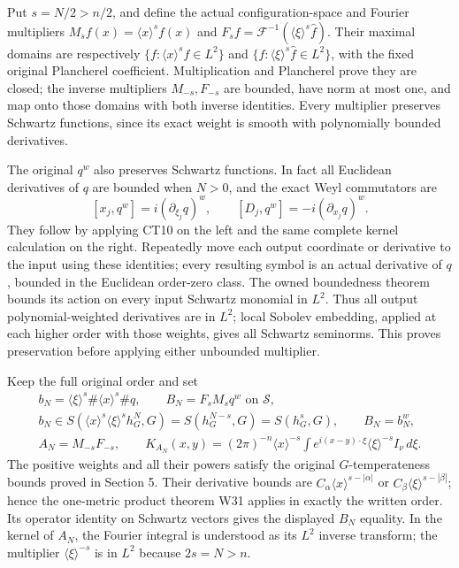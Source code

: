 \documentclass[
  11pt,
]{article}
\begin{document}
Put \(s=N/2>n/2\), and define the actual configuration-space and Fourier
multipliers \(M_s f(x)=\langle x\rangle^sf(x)\) and
\(F_s f=\mathcal F^{-1}(\langle\xi\rangle^s\widehat f)\). Their maximal
domains are respectively \(\{f:\langle x\rangle^sf\in L^2\}\) and
\(\{f:\langle\xi\rangle^s\widehat f\in L^2\}\), with the fixed original
Plancherel coefficient. Multiplication and Plancherel prove they are
closed; the inverse multipliers \(M_{-s},F_{-s}\) are bounded, have norm
at most one, and map onto those domains with both inverse identities.
Every multiplier preserves Schwartz functions, since its exact weight is
smooth with polynomially bounded derivatives.

The original \(q^w\) also preserves Schwartz functions. In fact all
Euclidean derivatives of \(q\) are bounded when \(N>0\), and the exact
Weyl commutators are \[
 [x_j,q^w]=i(\partial_{\xi_j}q)^w,\qquad
 [D_j,q^w]=-i(\partial_{x_j}q)^w.
 \tag{PT16}
\] They follow by applying CT10 on the left and the same complete kernel
calculation on the right. Repeatedly move each output coordinate or
derivative to the input using these identities; every resulting symbol
is an actual derivative of \(q\), bounded in the Euclidean order-zero
class. The owned boundedness theorem bounds its action on every input
Schwartz monomial in \(L^2\). Thus all output polynomial-weighted
derivatives are in \(L^2\); local Sobolev embedding, applied at each
higher order with those weights, gives all Schwartz seminorms. This
proves preservation before applying either unbounded multiplier.

Keep the full original order and set \[
 \begin{gathered}
 b_N=\langle\xi\rangle^s\#\langle x\rangle^s\#q,
 \qquad B_N=F_sM_sq^w\text{ on }\mathcal S,\\
 b_N\in S(\langle x\rangle^s\langle\xi\rangle^s h_G^N,G)
        =S(h_G^{N-s},G)=S(h_G^s,G),\qquad B_N=b_N^w,\\
 A_N=M_{-s}F_{-s},\qquad
 K_{A_N}(x,y)=(2\pi)^{-n}\langle x\rangle^{-s}
       \int e^{i(x-y)\cdot\xi}\langle\xi\rangle^{-s}I_\nu\,d\xi.
 \end{gathered}                                                   \tag{PT17}
\] The positive weights and all their powers satisfy the original
\(G\)-temperateness bounds proved in Section 5. Their derivative bounds
are \(C_\alpha\langle x\rangle^{s-|\alpha|}\) or
\(C_\beta\langle\xi\rangle^{s-|\beta|}\); hence the one-metric product
theorem W31 applies in exactly the written order. Its operator identity
on Schwartz vectors gives the displayed \(B_N\) equality. In the kernel
of \(A_N\), the Fourier integral is understood as its \(L^2\) inverse
transform; the multiplier \(\langle\xi\rangle^{-s}\) is in \(L^2\)
because \(2s=N>n\).
\end{document}

